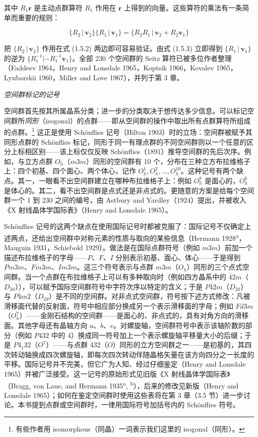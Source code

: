 其中 $R_{1}\mathbf{r}$ 是主动点群算符 $R_{1}$ 作用在 $\mathbf{r}$ 上得到的向量。这些算符的乘法有一条简单而重要的规则：

\begin{equation*}
\{R_{2} \,|\, \mathbf{v}_{2}\}\{R_{1} \,|\, \mathbf{v}_{1}\} = \{R_{2}R_{1} \,|\, \mathbf{v}_{2} + R_{2}\mathbf{v}_{1}\}
\tag{1.5.3}
\end{equation*}

把 $\{R_{2} \,|\, \mathbf{v}_{2}\}$ 作用在式 (1.5.2) 两边即可容易验证。由式 (1.5.3) 立即得到 $\{R_{1} \,|\, \mathbf{v}_{1}\}$ 的逆为 $\{R_{1}^{-1} | -R_{1}^{-1}\mathbf{v}_{1}\}$。全部 230 个空间群的 Seitz 算符已被多位作者整理（Faddeev 1964，Henry and Lonsdale 1965，Koptsik 1966，Kovalev 1965，Lyubarskii 1960，Miller and Love 1967），并列于第 3 章。

\textit{空间群标记的记号}

空间群首先按其所属晶系分类；进一步的分类取决于想传达多少信息。可以标记空间群所\textit{同形}（isogonal）的点群——即从空间群的操作中取出所有点群算符所组成的点群。\footnote{有些作者用 isomorphous（同晶）一词表示我们这里的 isogonal（同形）。} 这正是使用 Schönflies 记号（Hilton 1903）时的立场：空间群被赋予其同形点群的 Schönflies 标记，同形于同一有理点群的不同空间群则以一个任意的区分上标相区别——该上标仅仅反映 Schönflies（1891）推导空间群的先后次序。例如，与立方点群 $O_{h}$（$m3m$）同形的空间群有 10 个，分布在三种立方布拉维格子上：四个初基、四个面心、两个体心，记作 $O_{h}^{1}, O_{h}^{2}, \ldots, O_{h}^{10}$。这种记号有两个缺点。其一，一眼看不出空间群建立在哪种布拉维格子上：例如 $O_{h}^{8}$ 是面心的，$O_{h}^{6}$ 是体心的。其二，看不出空间群是点式还是非点式的。更随意的方案是给每个空间群一个 1 到 230 之间的编号，由 Astbury and Yardley（1924）提出，并被收入《X 射线晶体学国际表》（Henry and Lonsdale 1965）。

Schönflies 记号的这两个缺点在使用国际记号时都被克服了：国际记号不仅确定上述两点，还给出空间群中对称元素的性质与取向的某些信息（Hermann 1928\textsuperscript{a}，Mauguin 1931，Schiebold 1929）。做法是在国际点群符号（例如 $m3m$）前加一个描述布拉维格子的字母——$P$、$F$、$I$ 分别表示初基、面心、体心——于是得到 $Pm3m$、$Fm3m$、$Im3m$。这三个符号表示与点群 $m3m$（$O_{h}$）同形的三个点式空间群。当一个点群在布拉维格子上可以有多种取向时（例如四方晶系中的 $\bar{4}2m$（$D_{2d}$）），可以赋予国际空间群符号中字符次序以特定的含义；于是 $P\bar{4}2m$（$D_{2d}$）与 $P\bar{4}m2$（$D_{2d}$）是不同的空间群。对非点式空间群，符号按下述方式修改：凡被滑移面代替的反射面，符号中相应部分换成另一个表示滑移面的字母；例如 $Fd3m$（$O_{h}^{7}$）——金刚石结构的空间群——是面心的、非点式的，具有对角方向的滑移面。其他字母还有晶轴方向 $a$、$b$、$c$。对螺旋轴，空间群符号中表示该轴阶数的部分（例如 $P432$ 中的 4）换成同一符号加上一个表示螺旋轴平移量大小的后缀；于是 $P4_{1}32$（$O^{7}$）——与点群 432（$O$）同形的立方空间群之一——是初基的，其四次转动轴换成四次螺旋轴，即每次四次转动伴随晶格矢量在该方向四分之一长度的平移。国际记号并不完美，但它广为人知、经过仔细鉴定（Henry and Lonsdale 1965）并被广泛接受。这一记号的原始形式见旧版《X 射线晶体学国际表》（Bragg, von Laue, and Hermann 1935\textsuperscript{a}, \textsuperscript{b}），后来的修改见新版（Henry and Lonsdale 1965）；如何在鉴定空间群时使用这些表将在第 3 章（3.5 节）进一步讨论。本书提到点群或空间群时，一律用国际符号加括号内的 Schönflies 符号。

